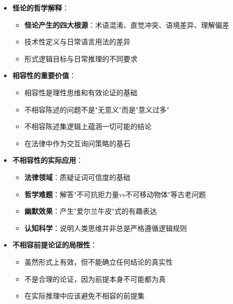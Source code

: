 \begin{center}
{{\begin{itemize}
\begin{itemize}
  \item \textbf{四大特征}：普遍性、可证明性、逻辑必然性、不可能性条件
  \item \textbf{与实质蕴涵怪论的比较}：形式、含义、基础的对比分析
  \item 两种怪论的相似性和差异性
  \end{itemize}
\item \textbf{怪论的哲学解释}：
  \begin{itemize}
  \item \textbf{怪论产生的四大根源}：术语混淆、直觉冲突、语境差异、理解偏差
  \item 技术性定义与日常语言用法的差异
  \item 形式逻辑目标与日常推理的不同要求
  \end{itemize}
\item \textbf{相容性的重要价值}：
  \begin{itemize}
  \item 相容性是理性思维和有效论证的基础
  \item 不相容陈述的问题不是"无意义"而是"意义过多"
  \item 不相容陈述集逻辑上蕴涵一切可能的结论
  \item 在法律中作为交互询问策略的基石
  \end{itemize}
\item \textbf{不相容性的实际应用}：
  \begin{itemize}
  \item \textbf{法律领域}：质疑证词可信度的基础
  \item \textbf{哲学难题}：解答"不可抗拒力量vs不可移动物体"等古老问题
  \item \textbf{幽默效果}：产生"爱尔兰牛皮"式的有趣表达
  \item \textbf{认知科学}：说明人类思维并非总是严格遵循逻辑规则
  \end{itemize}
\item \textbf{不相容前提论证的局限性}：
  \begin{itemize}
  \item 虽然形式上有效，但不能确立任何结论的真实性
  \item 不是合理的论证，因为前提本身不可能都为真
  \item 在实际推理中应该避免不相容的前提集
  \end{itemize}
\end{itemize}
}}
\end{center}